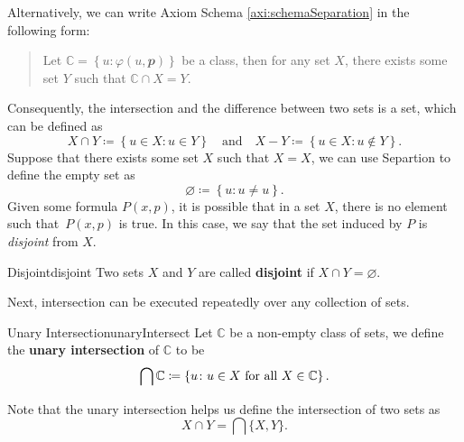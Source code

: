 \documentclass[math]{amznotes}
\theoremstyle{remark}
\begin{document}
Alternatively, we can write Axiom Schema \ref{axi:schemaSeparation} in the following form:
\begin{quote}
    Let $\mathbb{C} = \left\{u \colon \varphi(u, \mathbfit{p})\right\}$ be a class, then for any set $X$, there exists some set $Y$ such that $\mathbb{C} \cap X = Y$.
\end{quote}
Consequently, the intersection and the difference between two sets is a set, which can be defined as
\begin{displaymath}
    X \cap Y \coloneqq \left\{u \in X \colon u \in Y\right\} \quad \textrm{and} \quad X - Y \coloneqq \left\{u \in X \colon u \notin Y\right\}. 
\end{displaymath}
Suppose that there exists some set $X$ such that $X = X$, we can use Separtion to define the empty set as
\begin{displaymath}
    \varnothing \coloneqq \left\{u \colon u \neq u\right\}.
\end{displaymath}
Given some formula $P\left(x, p\right)$, it is possible that in a set $X$, there is no element such that~$P\left(x, p\right)$ is true. In this case, we say that the set induced by $P$ is \textit{disjoint} from $X$.
\begin{dfnbox}{Disjoint}{disjoint}
    Two sets $X$ and $Y$ are called {\color{red} \textbf{disjoint}} if $X \cap Y = \varnothing$.
\end{dfnbox}
Next, intersection can be executed repeatedly over any collection of sets. 
\begin{dfnbox}{Unary Intersection}{unaryIntersect}
    Let $\mathbb{C}$ be a non-empty class of sets, we define the {\color{red} \textbf{unary intersection}} of $\mathbb{C}$ to be
    \begin{displaymath}
        \bigcap \mathbb{C} \coloneqq \left\{u \colon u \in X \textrm{ for all } X \in \mathbb{C} \right\}.
    \end{displaymath}
\end{dfnbox}   
Note that the unary intersection helps us define the intersection of two sets as 
\begin{equation*}
    X \cap Y = \bigcap\{X, Y\}.
\end{equation*} 
\end{document}
